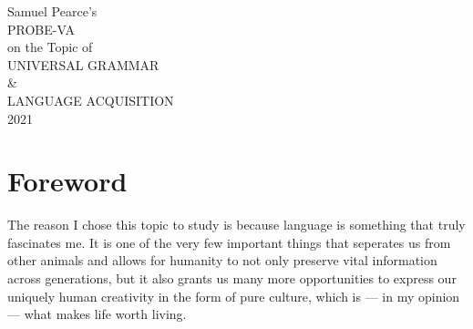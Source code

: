 \documentclass[a4paper,10pt]{article}
\begin{document}
\begingroup%
\centering
\vfill
\Large{Samuel Pearce's}\\
\huge{PROBE-VA}\\
\Large{on the Topic of}\\[\baselineskip]
\Huge{UNIVERSAL GRAMMAR}\\
\huge{\&}\\
\Huge{LANGUAGE ACQUISITION}\\[\baselineskip]
\large{\scshape 2021}\par
\vfill\null
\endgroup

\begin{abstract}
	The goal of this project was twofold: for one half, I intended to expand my knowledge on
	the topic of Chomsky's Universal Grammar theory by reading an introductory book on
	the matter and writing a paper summarising my findings and opinion on the concept. For the other
	half, I conducted an informal experiment with two participants in which I taught them both the language
	Toki Pona\footnotemark through two of the most common methods; one learnt through pure immersion,
	while the other learnt using the Toki Pona official course book. Finally, with the results of
	both halves of the project complete, I summarised my findings about universal grammar into a
	separate document and compiled the experiment results here alongside my reflection on the
	project as a whole.
\end{abstract}


\pagebreak


\tableofcontents
\pagebreak


\section{Foreword}
The reason I chose this topic to study is because language is something that truly fascinates me.
It is one of the very few important things that seperates us from other animals and allows for humanity
to not only preserve vital information across generations, but it also
grants us many more opportunities to express our uniquely human creativity in the form of pure
culture, which is --- in my opinion --- what makes life worth living.
\end{document}
